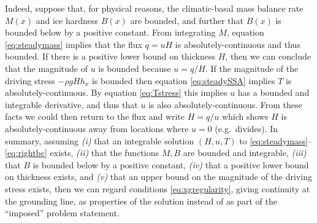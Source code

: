 \documentclass[twocolumn,letterpaper]{igs}
\begin{document}
Indeed, suppose that, for physical reasons, the climatic-basal mass balance rate $M(x)$ and ice hardness $B(x)$ are bounded, and further that $B(x)$ is bounded below by a positive constant.  From integrating $M$, equation \eqref{eq:steadymass} implies that the flux $q=uH$ is absolutely-continuous and thus bounded.  If there is a positive lower bound on thickness $H$, then we can conclude that the magnitude of $u$ is bounded because $u=q/H$.  If the magnitude of the driving stress $-\rho g H h_x$ is bounded then equation \eqref{eq:steadySSA} implies $T$ is absolutely-continuous.  By equation \eqref{eq:Tstress} this implies $u$ has a bounded and integrable derivative, and thus that $u$ is also absolutely-continuous.  From these facts we could then return to the flux and write $H=q/u$ which shows $H$ is absolutely-continuous away from locations where $u=0$ (e.g.~divides).  In summary, assuming \emph{(i)} that an integrable solution $(H,u,T)$ to \eqref{eq:steadymass}--\eqref{eq:rightbc} exists, \emph{(ii)} that the functions $M,B$ are bounded and integrable, \emph{(iii)} that $B$ is bounded below by a positive constant, \emph{(iv)} that a positive lower bound on thickness exists, and \emph{(v)} that an upper bound on the magnitude of the driving stress exists, then we can regard conditions \eqref{eq:xgregularity}, giving continuity at the grounding line, as properties of the solution instead of as part of the ``imposed'' problem statement.
\end{document}
